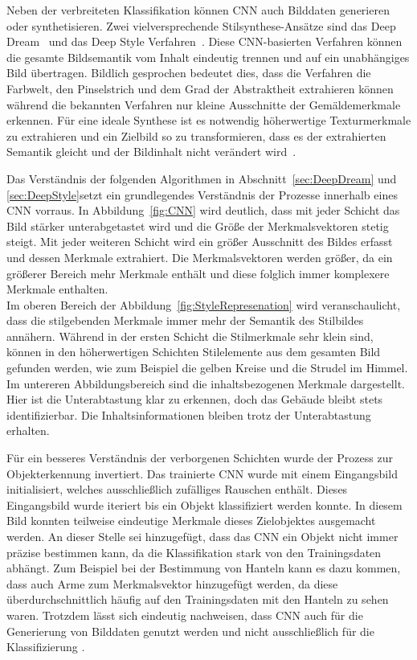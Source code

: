 \documentclass[times, 11pt,twocolumn]{article}
\begin{document}
Neben der verbreiteten Klassifikation können CNN auch Bilddaten generieren oder synthetisieren. Zwei vielversprechende Stilsynthese-Ansätze sind das Deep Dream~\cite{DeepDream} und das Deep Style Verfahren~\cite{GatysEB15a}. Diese CNN-basierten Verfahren können die gesamte Bildsemantik vom Inhalt eindeutig trennen und auf ein unabhängiges Bild übertragen. Bildlich gesprochen bedeutet dies, dass die  Verfahren die Farbwelt, den Pinselstrich und dem Grad der Abstraktheit extrahieren können während die bekannten Verfahren nur kleine Ausschnitte der Gemäldemerkmale erkennen. Für eine ideale Synthese ist es notwendig  höherwertige Texturmerkmale zu extrahieren und ein Zielbild so zu transformieren, dass es der extrahierten Semantik gleicht und der Bildinhalt nicht verändert wird~\cite{McCaigDG16}.

\label{sec:Stilsynthese}
Das Verständnis der folgenden Algorithmen in Abschnitt~\ref{sec:DeepDream} und \ref{sec:DeepStyle}setzt ein grundlegendes Verständnis der Prozesse innerhalb eines CNN vorraus. In Abbildung~\ref{fig:CNN} wird deutlich, dass mit jeder Schicht das Bild stärker unterabgetastet wird und die Größe der Merkmalsvektoren stetig steigt. Mit jeder weiteren Schicht wird ein größer Ausschnitt des Bildes erfasst und dessen Merkmale extrahiert. Die Merkmalsvektoren werden größer, da ein größerer Bereich mehr Merkmale enthält und diese folglich immer komplexere Merkmale enthalten. \\
Im oberen Bereich der Abbildung~\ref{fig:StyleRepresenation} wird veranschaulicht, dass die stilgebenden Merkmale immer mehr der Semantik des Stilbildes annähern. Während in der ersten Schicht die Stilmerkmale sehr klein sind, können in den höherwertigen Schichten Stilelemente aus dem gesamten Bild gefunden werden, wie zum Beispiel die gelben Kreise und die Strudel im Himmel. Im untereren Abbildungsbereich sind die inhaltsbezogenen Merkmale dargestellt. Hier ist die Unterabtastung klar zu erkennen, doch das Gebäude bleibt stets identifizierbar. Die Inhaltsinformationen bleiben trotz der Unterabtastung erhalten.

Für ein besseres Verständnis der verborgenen Schichten wurde der  Prozess zur Objekterkennung invertiert. Das trainierte CNN wurde mit einem Eingangsbild initialisiert, welches ausschließlich zufälliges Rauschen enthält. Dieses Eingangsbild wurde iteriert bis ein Objekt klassifiziert werden konnte. In diesem Bild konnten teilweise eindeutige Merkmale dieses Zielobjektes ausgemacht werden. An dieser Stelle sei hinzugefügt, dass das CNN ein Objekt nicht immer präzise bestimmen kann, da die Klassifikation stark von den Trainingsdaten abhängt. Zum Beispiel bei der Bestimmung von Hanteln kann es dazu kommen, dass auch Arme zum Merkmalsvektor hinzugefügt werden, da diese überdurchschnittlich häufig auf den Trainingsdaten mit den Hanteln zu sehen waren. 
Trotzdem lässt sich eindeutig nachweisen, dass CNN auch für die Generierung von Bilddaten genutzt werden und nicht ausschließlich für die Klassifizierung \cite{DeepDream}\cite{MahendranV14}.
\end{document}
